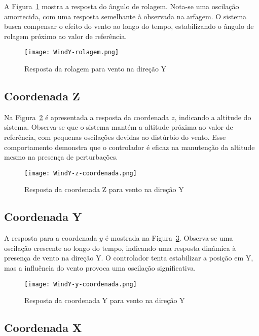 A Figura~\ref{fig:WindY-rolagem} mostra a resposta do ângulo de rolagem. Nota-se uma oscilação amortecida, com uma resposta semelhante à observada na arfagem. O sistema busca compensar o efeito do vento ao longo do tempo, estabilizando o ângulo de rolagem próximo ao valor de referência.

\begin{figure}[H]
    \centering
    \texttt{[image: WindY-rolagem.png]}
    \caption{Resposta da rolagem para vento na direção Y}
    \label{fig:WindY-rolagem}
\end{figure}

\subsection{Coordenada Z}

Na Figura~\ref{fig:WindY-z} é apresentada a resposta da coordenada \(z\), indicando a altitude do sistema. Observa-se que o sistema mantém a altitude próxima ao valor de referência, com pequenas oscilações devidas ao distúrbio do vento. Esse comportamento demonstra que o controlador é eficaz na manutenção da altitude mesmo na presença de perturbações.

\begin{figure}[H]
    \centering
    \texttt{[image: WindY-z-coordenada.png]}
    \caption{Resposta da coordenada Z para vento na direção Y}
    \label{fig:WindY-z}
\end{figure}

\subsection{Coordenada Y}

A resposta para a coordenada \(y\) é mostrada na Figura~\ref{fig:WindY-y}. Observa-se uma oscilação crescente ao longo do tempo, indicando uma resposta dinâmica à presença de vento na direção Y. O controlador tenta estabilizar a posição em Y, mas a influência do vento provoca uma oscilação significativa.

\begin{figure}[H]
    \centering
    \texttt{[image: WindY-y-coordenada.png]}
    \caption{Resposta da coordenada Y para vento na direção Y}
    \label{fig:WindY-y}
\end{figure}

\subsection{Coordenada X}

